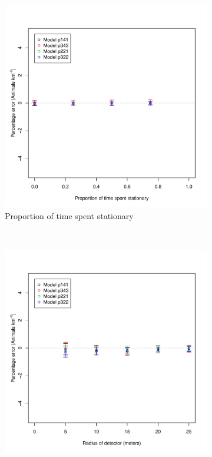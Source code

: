 \documentclass[a4paper,10pt,reqno,oneside]{amsart}
\begin{document}
\begin{figure}[t]
        \centering
        \begin{subfigure}[t]{0.5\textwidth}
                \centering
		\includegraphics[width=1\textwidth]{imgs/ResultsPerching.pdf}
                \caption{Proportion of time spent stationary}
                \label{f:Perch}
        \end{subfigure}
        ~ 
        \begin{subfigure}[t]{0.5\textwidth}
                \centering
		\includegraphics[width=1\textwidth]{imgs/ResultsRadii.pdf}

\end{subfigure}
\end{figure}
\end{document}
